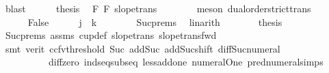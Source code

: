 \begin{isabellebody}
\ blast\isanewline
\ \ \ \ \isamarkupfalse%
\ {\isacharquery}{\kern0pt}thesis\ \isamarkupfalse%
\ F{}\ F{}\ slope{\isacharunderscore}{\kern0pt}trans{\isacharparenleft}{\kern0pt}{}{\isacharparenright}{\kern0pt}\isanewline
\ \ \ \ \ \ \isamarkupfalse%
\ {\isacharparenleft}{\kern0pt}meson\ dual{\isacharunderscore}{\kern0pt}order{\isachardot}{\kern0pt}strict{\isacharunderscore}{\kern0pt}trans{\isacharparenright}{\kern0pt}\isanewline
\ \ \isamarkupfalse%
\isanewline
\ \ \ \ \isamarkupfalse%
\ False\isanewline
\ \ \ \ \isamarkupfalse%
\ {\isachardoublequoteopen}j{\isacharplus}{\kern0pt}{}\ {\isacharequal}{\kern0pt}\ k{\isachardoublequoteclose}\isanewline
\ \ \ \ \ \ \isamarkupfalse%
\ Suc{\isachardot}{\kern0pt}prems\ \isamarkupfalse%
\ linarith\isanewline
\ \ \ \ \isamarkupfalse%
\ \isamarkupfalse%
\ {\isacharquery}{\kern0pt}thesis\isanewline
\ \ \ \ \ \ \isamarkupfalse%
\ Suc{\isachardot}{\kern0pt}prems\ assms{\isacharparenleft}{\kern0pt}{}{\isacharparenright}{\kern0pt}\ cup{\isacharunderscore}{\kern0pt}def\ slope{\isacharunderscore}{\kern0pt}trans{\isacharparenleft}{\kern0pt}{}{\isacharparenright}{\kern0pt}\ slope{\isacharunderscore}{\kern0pt}trans{\isacharunderscore}{\kern0pt}fwd\isanewline
\ \ \ \ \ \ \isamarkupfalse%
\ {\isacharparenleft}{\kern0pt}smt\ {\isacharparenleft}{\kern0pt}verit{\isacharcomma}{\kern0pt}\ ccfv{\isacharunderscore}{\kern0pt}threshold{\isacharparenright}{\kern0pt}\ Suc{\isacharunderscore}{\kern0pt}{}\ add{\isacharunderscore}{\kern0pt}Suc\ add{\isacharunderscore}{\kern0pt}Suc{\isacharunderscore}{\kern0pt}shift\ diff{\isacharunderscore}{\kern0pt}Suc{\isacharunderscore}{\kern0pt}numeral\isanewline
\ \ \ \ \ \ \ \ \ \ diff{\isacharunderscore}{\kern0pt}zero\ ind{\isacharunderscore}{\kern0pt}seq{\isacharunderscore}{\kern0pt}subseq\ less{\isacharunderscore}{\kern0pt}add{\isacharunderscore}{\kern0pt}one\ numeral{\isacharunderscore}{\kern0pt}One\ pred{\isacharunderscore}{\kern0pt}numeral{\isacharunderscore}{\kern0pt}simps{\isacharparenleft}{\kern0pt}{}{\isacharparenright}{\kern0pt}{\isacharparenright}{\kern0pt}\isanewline
\ \ \isamarkupfalse%
\isanewline
{}\isamarkupfalse%
%
\endisatagproof
{\isafoldproof}%
%
\isadelimproof
\isanewline
%
\endisadelimproof
\isanewline
\isanewline

\end{isabellebody}
